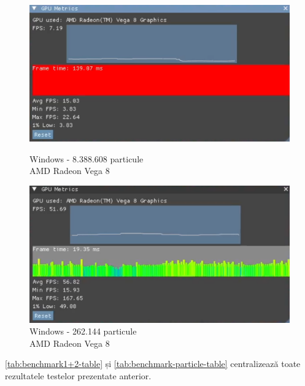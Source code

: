 \begin{figure}[ht]
    \centering
    \begin{minipage}[b]{0.48\textwidth}
        \centering
        \includegraphics[width=\textwidth]{images/laptop-non-2.png}
        \caption{Windows - 8.388.608 particule \\ \hspace*{6em} AMD Radeon Vega 8}
        \label{fig:laptop-non-test-2}
    \end{minipage}
    \hfill
    \begin{minipage}[b]{0.48\textwidth}
        \centering
        \includegraphics[width=\textwidth]{images/laptop-opt-2.png}
        \caption{Windows - 262.144 particule \\ \hspace*{6em} AMD Radeon Vega 8}
        \label{fig:laptop-opt-test-2}
    \end{minipage}
\end{figure}

\autoref{tab:benchmark1+2-table} și \autoref{tab:benchmark-particle-table} centralizează toate rezultatele testelor prezentate anterior. 

